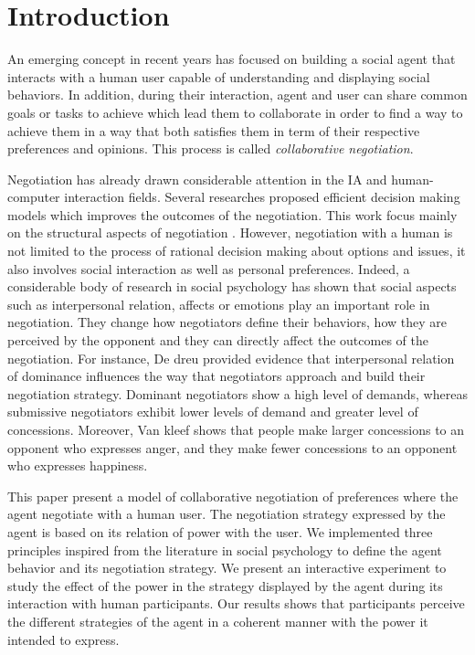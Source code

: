 \documentclass[runningheads,a4paper]{llncs}
\begin{document}
	
	\section{Introduction}
	An emerging concept in recent years has focused on building a social agent that interacts with a human user capable of understanding and displaying social behaviors. In addition, during their interaction, agent and user can share common goals or tasks to achieve which lead them to collaborate in order to find a way to achieve them in a way that both satisfies them in term of their respective preferences and opinions. This process is called \emph{collaborative negotiation}.
	
	Negotiation has already drawn considerable attention in the IA and human-computer interaction fields. Several researches proposed efficient decision making models which improves the outcomes of the negotiation. This work focus mainly on the structural aspects of negotiation \cite{sycara2010agent,lai2009generic}. 
	However, negotiation with a human  is not limited to the process of rational decision making about options and
	issues, it also involves social interaction as well as personal preferences. Indeed, a considerable body of research in social psychology has shown that social aspects such as interpersonal relation, affects or emotions play an important role in negotiation. They change how negotiators define their behaviors, how they are perceived by the opponent and they can directly affect the outcomes of the negotiation.
	For instance, De dreu\cite{de1995impact} provided evidence that interpersonal relation of dominance influences the way that negotiators approach and build their negotiation strategy. Dominant negotiators show a high level of demands, whereas submissive negotiators exhibit lower levels of demand and greater level of concessions. Moreover, Van kleef \cite{van2006power}	shows that people make larger concessions to an opponent who expresses anger, and they make fewer concessions to an opponent who expresses happiness.

	This paper present a model of collaborative negotiation of preferences where the agent negotiate with a human user. The negotiation strategy expressed by the agent is based on its relation of power with the user. We implemented three principles inspired from the literature in social psychology to define the agent behavior and its negotiation strategy. We present an interactive experiment to study the effect of the power in the strategy displayed by the agent during its interaction with human participants. Our results shows that participants perceive the different strategies of the agent in a coherent manner with the power it intended to express. 
	
\end{document}
